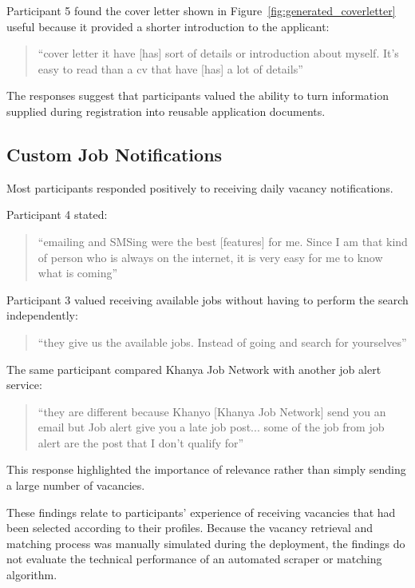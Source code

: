 Participant 5 found the cover letter shown in Figure~\ref{fig:generated_coverletter} useful because it provided a shorter introduction to the applicant:

\begin{quote}
``cover letter it have [has] sort of details or introduction about myself. It's easy to read than a cv that have [has] a lot of details''
\end{quote}

The responses suggest that participants valued the ability to turn information supplied during registration into reusable application documents.


\subsection{Custom Job Notifications}

Most participants responded positively to receiving daily vacancy notifications.

Participant 4 stated:

\begin{quote}
``emailing and SMSing were the best [features] for me. Since I am that kind of person who is always on the internet, it is very easy for me to know what is coming''
\end{quote}

Participant 3 valued receiving available jobs without having to perform the search independently:

\begin{quote}
``they give us the available jobs. Instead of going and search for yourselves''
\end{quote}

The same participant compared Khanya Job Network with another job alert service:

\begin{quote}
``they are different because Khanyo [Khanya Job Network] send you an email but Job alert give you a late job post... some of the job from job alert are the post that I don't qualify for''
\end{quote}

This response highlighted the importance of relevance rather than simply sending a large number of vacancies.

These findings relate to participants' experience of receiving vacancies that had been selected according to their profiles. Because the vacancy retrieval and matching process was manually simulated during the deployment, the findings do not evaluate the technical performance of an automated scraper or matching algorithm.


